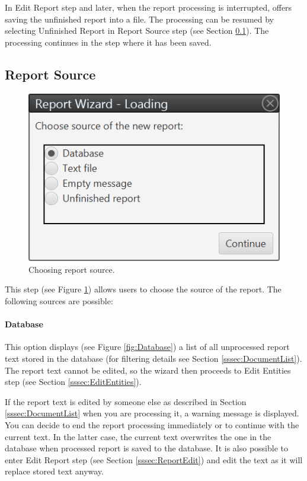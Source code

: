 In Edit Report step and later, when the report processing is interrupted,
\textan{} offers saving the unfinished report into a file. The processing can
be resumed by selecting Unfinished Report in Report Source step (see Section
\ref{sssec:ReportSource}). The processing continues in the step where it has
been saved.

\subsection{Report Source}
\label{sssec:ReportSource}

\begin{figure}[!htb]
        \centering
        \includegraphics{Images/source}
        \caption{Choosing report source.}
        \label{fig:Source}
\end{figure}

This step (see Figure \ref{fig:Source}) allows users to choose the source of the
report. The following sources are possible:

\paragraph{Database} This option displays (see Figure \ref{fig:Database}) a list
of all unprocessed report text stored in the database (for filtering details see
Section \ref{sssec:DocumentList}). The report text cannot be edited, so the
wizard then proceeds to Edit Entities step (see Section
\ref{sssec:EditEntities}).

If the report text is edited by someone else as described in Section
\ref{sssec:DocumentList} when you are processing it, a warning message is
displayed. You can decide to end the report processing immediately
or to continue with the current text. In the latter case, the current text
overwrites the one in the database when processed report is saved to the
database. It is also possible to enter Edit Report step (see Section
\ref{sssec:ReportEdit}) and edit the text as it will replace stored text anyway.

